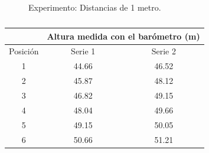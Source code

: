 \documentclass[main]{subfiles}
\begin{document}
\begin{figure}[H]
\vspace{-14pt}
\hspace{-30pt}
  \caption{Experimento: Distancias de 1 metro.}
\label{fig:1m}
\end{figure}

\vspace{-10pt}
\begin{table}
\begin{tabular}{c|c|c|} 
	& \multicolumn{2}{|p{100pt}|}{\cellcolor[gray]{0.8} Altura medida con el barómetro (m)}      \\ \hline
\cellcolor[gray]{0.8} {Posición} & \cellcolor[gray]{0.8} {Serie 1} &\cellcolor[gray]{0.8} {Serie 2}\\ \hline

\multicolumn{1}{|c|}{1} & 44.66 & 46.52 \\ \hline
\multicolumn{1}{|c|}{2} & 45.87 & 48.12\\ \hline
\multicolumn{1}{|c|}{3} & 46.82 & 49.15\\ \hline
\multicolumn{1}{|c|}{4} & 48.04 & 49.66\\ \hline
\multicolumn{1}{|c|}{5} & 49.15 & 50.05\\ \hline
\multicolumn{1}{|c|}{6} & 50.66 & 51.21 \\ \hline

\end{tabular}
\caption{}
\label{tab:alturasm}
\end{table}
\end{document}

